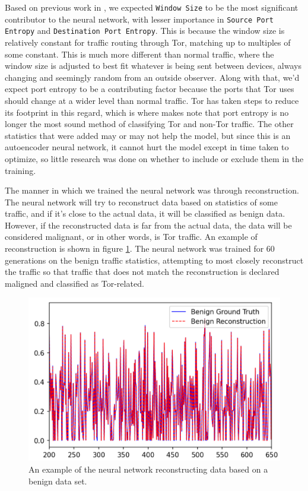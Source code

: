 \documentclass[conference,12pt]{IEEEtran}
\begin{document}
Based on previous work in \parencite{cite:Tree-Based-Models}, we expected \texttt{Window Size} to be the most significant contributor to the neural network, with lesser importance in \texttt{Source Port Entropy} and \texttt{Destination Port Entropy}. This is because the window size is relatively constant for traffic routing through Tor, matching up to multiples of some constant. This is much more different than normal traffic, where the window size is adjusted to best fit whatever is being sent between devices, always changing and seemingly random from an outside observer. Along with that, we'd expect port entropy to be a contributing factor because the ports that Tor uses should change at a wider level than normal traffic. Tor has taken steps to reduce its footprint in this regard, which is where \parencite{cite:Tree-Based-Models} makes note that port entropy is no longer the most sound method of classifying Tor and non-Tor traffic. The other statistics that were added may or may not help the model, but since this is an autoencoder neural network, it cannot hurt the model except in time taken to optimize, so little research was done on whether to include or exclude them in the training.

The manner in which we trained the neural network was through reconstruction. The neural network will try to reconstruct data based on statistics of some traffic, and if it's close to the actual data, it will be classified as benign data. However, if the reconstructed data is far from the actual data, the data will be considered malignant, or in other words, is Tor traffic. An example of reconstruction is shown in figure \ref{fig:reconstruction}. The neural network was trained for 60 generations on the benign traffic statistics, attempting to most closely reconstruct the traffic so that traffic that does not match the reconstruction is declared maligned and classified as Tor-related.

\begin{figure}[H]
    \centering
    \includegraphics[scale=0.4]{Project-Results/Benign-Reconstruction.png}
    \caption{An example of the neural network reconstructing data based on a benign data set.}
    \label{fig:reconstruction}
\end{figure}
\end{document}

